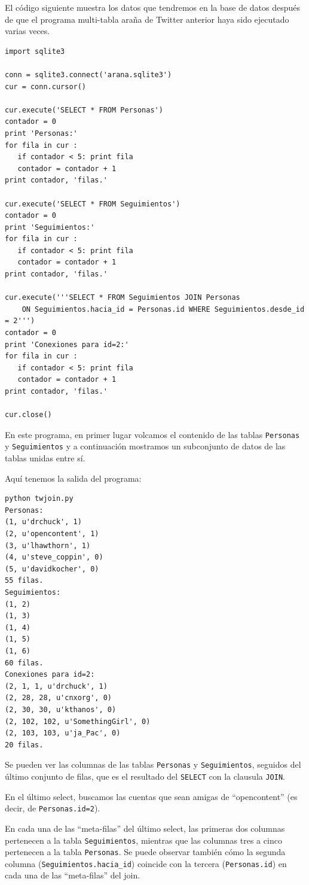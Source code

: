 El código siguiente muestra los datos que tendremos en la
base de datos después de que el programa multi-tabla araña de Twitter anterior
haya sido ejecutado varias veces.

\beforeverb
\begin{verbatim}
import sqlite3

conn = sqlite3.connect('arana.sqlite3')
cur = conn.cursor()

cur.execute('SELECT * FROM Personas')
contador = 0
print 'Personas:'
for fila in cur :
   if contador < 5: print fila
   contador = contador + 1
print contador, 'filas.'

cur.execute('SELECT * FROM Seguimientos')
contador = 0
print 'Seguimientos:'
for fila in cur :
   if contador < 5: print fila
   contador = contador + 1
print contador, 'filas.'

cur.execute('''SELECT * FROM Seguimientos JOIN Personas 
    ON Seguimientos.hacia_id = Personas.id WHERE Seguimientos.desde_id = 2''')
contador = 0
print 'Conexiones para id=2:'
for fila in cur :
   if contador < 5: print fila
   contador = contador + 1
print contador, 'filas.'

cur.close()
\end{verbatim}
\afterverb
%
En este programa, en primer lugar volcamos el contenido de las tablas {\tt Personas}
y {\tt Seguimientos} y a continuación mostramos un subconjunto de
datos de las tablas unidas entre sí.

Aquí tenemos la salida del programa:

\beforeverb
\begin{verbatim}
python twjoin.py 
Personas:
(1, u'drchuck', 1)
(2, u'opencontent', 1)
(3, u'lhawthorn', 1)
(4, u'steve_coppin', 0)
(5, u'davidkocher', 0)
55 filas.
Seguimientos:
(1, 2)
(1, 3)
(1, 4)
(1, 5)
(1, 6)
60 filas.
Conexiones para id=2:
(2, 1, 1, u'drchuck', 1)
(2, 28, 28, u'cnxorg', 0)
(2, 30, 30, u'kthanos', 0)
(2, 102, 102, u'SomethingGirl', 0)
(2, 103, 103, u'ja_Pac', 0)
20 filas.
\end{verbatim}
\afterverb
%
Se pueden ver las columnas de las tablas {\tt Personas} y {\tt Seguimientos}, seguidos del último
conjunto de filas, que es el resultado del {\tt SELECT} con la clausula {\tt JOIN}.

En el último select, buscamos las cuentas que sean amigas de
``opencontent'' (es decir, de {\tt Personas.id=2}).

En cada una de las ``meta-filas'' del último select, las primeras dos columnas pertenecen
a la tabla {\tt Seguimientos}, mientras que las columnas tres a cinco pertenecen a la tabla
{\tt Personas}. Se puede observar también cómo la segunda columna (\verb"Seguimientos.hacia_id")
coincide con la tercera ({\tt Personas.id}) en cada una de las ``meta-filas'' del join.

